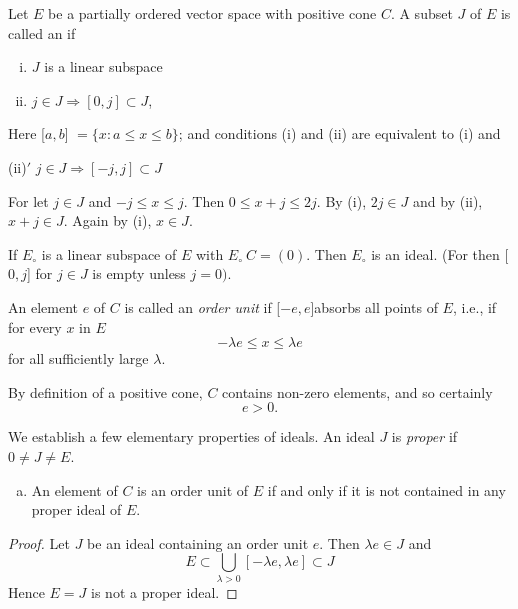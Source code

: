 \begin{Definition} %
  Let $E$ be a partially ordered vector space with positive cone
  $C$. A subset $J$ of $E$ is called an  if  
  \begin{enumerate}[(i)]
  \item $J$ is a linear subspace 
  \item $j \in J \Rightarrow [0, j] \subset J$,
  \end{enumerate} 
  Here [$a,b$] $= \big \{ x : a \leq x \leq b \big \}$; and conditions
  (i) and (ii) are equivalent to (i) and  
  
  (ii)$'$  $j \in J \Rightarrow [ -j,j ] \subset J$

  For let $j \in J$ and $-j \leq x \leq j$. Then $0 \leq x + j \leq
  2j$. By (i), $2j \in J$ and by (ii), $x + j \in J$. Again by (i), 
  $x \in J$. 
\end{Definition}

\begin{example*}%
  If $E_\circ$ is a linear subspace of $E$ with $E_\circ ~ C =
  (0)$. Then $E_\circ$ is an ideal. (For then [$0,j$] for $j \in J$
  is empty unless $j = 0 )$. 
\end{example*}

\begin{Definition}%
  An element $e$ of $C$ is called an {\em order unit} if
  [$-e,e$]\pageoriginale absorbs all points of $E$,  i.e., if for
  every $x$ in $E$  
  $$
  -\lambda e \leq x \leq  \lambda e
  $$
  for all sufficiently large $\lambda$.
\end{Definition}

By definition of a positive cone, $C$ contains non-zero elements, and
so certainly 
$$
e > 0.
$$

We establish a few elementary properties of ideals. An ideal $J$ is
\textit{proper} if $0 \neq J \neq E$. 

\begin{enumerate}[a)]
\item An element of $C$ is an order unit of $E$ if and only if it is
  not contained in any proper ideal of $E$. 
\end{enumerate}

\begin{proof}
  Let $J$ be an ideal containing an order unit $e$. Then $\lambda e
  \in J$ and  
  $$
  E \subset \bigcup\limits_{\lambda > 0}[ -\lambda e, \lambda e ]
  \subset J  
  $$
  Hence $E = J$ is not a proper ideal.
\end{proof}

